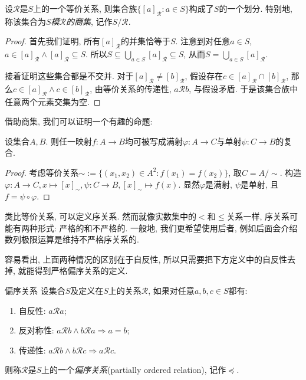 \begin{proposition}{}
	设$\mathcal{R}$是$S$上的一个等价关系, 则集合族$\{ [a]_{\mathcal{R}}: a \in S \}$构成了$S$的一个划分. 特别地, 称该集合为\textit{$S$模$\mathcal{R}$的商集}, 记作$S / \mathcal{R}$. 
\end{proposition}
\begin{proof}
	首先我们证明, 所有$[a]_{\mathcal{R}}$的并集恰等于$S$. 注意到对任意$a \in S$, $a \in [a]_{\mathcal{R}} \wedge [a]_{\mathcal{R}} \subseteq S$. 所以$S \subseteq \bigcup_{a \in S} [a]_{\mathcal{R}} \subseteq S$, 从而$S = \bigcup_{a \in S} [a]_{\mathcal{R}}$. 
	
	接着证明这些集合都是不交并. 对于$[a]_{\mathcal{R}} \neq [b]_{\mathcal{R}}$, 假设存在$c \in [a]_{\mathcal{R}} \cap [b]_{\mathcal{R}}$, 那么$c \in [a]_{\mathcal{R}} \wedge c \in [b]_{\mathcal{R}}$, 由等价关系的传递性, $a\mathcal{R}b$, 与假设矛盾. 于是该集合族中任意两个元素交集为空.
\end{proof}

借助商集, 我们可以证明一个有趣的命题: 

\begin{proposition}{}
	设集合$A,B$. 则任一映射$f:A \to B$均可被写成满射$\varphi :A \to C$与单射$\psi :C \to B$的复合. 
\end{proposition}
\begin{proof}
	考虑等价关系$\sim := \{ (x_1,x_2) \in A^2:f(x_1)=f(x_2) \}$, 取$C = A / \sim$. 构造$\varphi :A \to C,x \mapsto [x]_{\sim}, \psi : C \to B,[x]_{\sim} \mapsto f(x)$. 显然$\varphi$是满射, $\psi$是单射, 且$f=\psi \circ \varphi$. 
\end{proof}

类比等价关系, 可以定义序关系. 然而就像实数集中的$<$和$\leq$关系一样, 序关系可能有两种形式: 严格的和不严格的. 一般地, 我们更希望使用后者, 例如后面会介绍数列极限运算是维持不严格序关系的. 

容易看出, 上面两种情况的区别在于自反性, 所以只需要把下方定义中的自反性去掉, 就能得到严格偏序关系的定义. 

\begin{definition}{偏序关系}
	设集合$S$及定义在$S$上的关系$\mathcal{R}$, 如果对任意$a, b, c \in S$都有: 
	\begin{enumerate}
		\item 自反性: $a\mathcal{R} a$; 
		\item 反对称性: $a\mathcal{R} b \wedge b\mathcal{R} a \Rightarrow a=b$; 
		\item 传递性: $a\mathcal{R} b \wedge b\mathcal{R} c \Rightarrow a\mathcal{R} c$.
	\end{enumerate}
	则称$\mathcal{R}$是$S$上的一个\textit{偏序关系}(partially ordered relation), 记作$\preceq$.
\end{definition}


